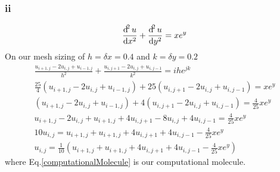 \documentclass[11pt]{article}
\numberwithin{equation}{section}
\begin{document}
\subsubsection*{ii}
\begin{align}
	\frac{\dif^2 u}{\dif x^2} + \frac{\dif^2 u}{\dif y^2} = xe^y
\end{align}
On our mesh sizing of $h=\delta x = 0.4$ and $k=\delta y = 0.2$
\begin{gather}
	\frac{u_{i+1,j} - 2u_{i,j} + u_{i-1,j}}{h^2} + \frac{u_{i,j+1} - 2u_{i,j} + u_{i,j-1}}{k^2} = ihe^{jk}\\
	\frac{25}{4}\left(u_{i+1,j} - 2u_{i,j} + u_{i-1,j}\right) + 25\left(u_{i,j+1} - 2u_{i,j} + u_{i,j-1}\right) = xe^y\\
	\left(u_{i+1,j} - 2u_{i,j} + u_{i-1,j}\right) + 4\left(u_{i,j+1} - 2u_{i,j} + u_{i,j-1}\right) = \frac{4}{25}xe^y\\
	u_{i+1,j} - 2u_{i,j} + u_{i+1,j} + 4u_{i,j+1} - 8u_{i,j} + 4u_{i,j-1} = \frac{4}{25}xe^y\\
	10u_{i,j} = u_{i+1,j}+ u_{i+1,j} + 4u_{i,j+1}+ 4u_{i,j-1} - \frac{4}{25}xe^y\\
	u_{i,j} = \frac{1}{10}\left(u_{i+1,j}+ u_{i+1,j} + 4u_{i,j+1}+ 4u_{i,j-1} - \frac{4}{25}xe^y\right) \label{computationalMolecule}
\end{gather}
where Eq.\ref{computationalMolecule} is our computational molecule.
\end{document}
